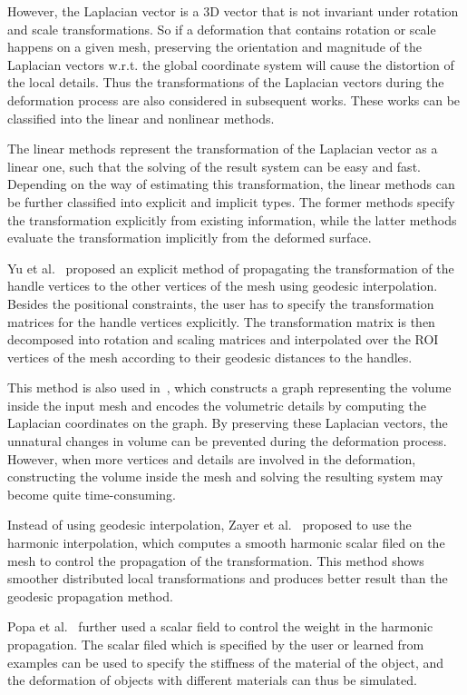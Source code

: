 However, the Laplacian vector  is a 3D vector that is not invariant
under rotation and scale transformations. So if a deformation that
contains rotation or scale happens on a given mesh, preserving the
orientation and magnitude of the Laplacian vectors w.r.t. the global
coordinate system will cause the distortion of the local details.
Thus the transformations of the Laplacian vectors during the
deformation process are also considered in subsequent works. These
works can be classified into the linear and nonlinear methods.

The linear methods represent the  transformation of the Laplacian
vector as a linear one, such that the solving of the result system
can be easy and fast. Depending on the way of estimating this
transformation, the linear methods can be further classified into
explicit and implicit types. The former methods specify the
transformation explicitly from existing information, while the
latter methods evaluate the transformation implicitly from the
deformed surface.

Yu et al.~\cite{YZXSBGS04}  proposed an explicit method of
propagating the transformation of the handle vertices to the other
vertices of the mesh using geodesic interpolation. Besides the
positional constraints, the user has to specify the transformation
matrices for the handle vertices explicitly. The transformation
matrix is then decomposed into rotation and scaling matrices and
interpolated over the ROI vertices of the mesh according to their
geodesic distances to the handles.

This method is also used in~\cite{ZHSLBGS05}, which  constructs a
graph representing the volume inside the input mesh and encodes the
volumetric details by computing the Laplacian coordinates on the
graph. By preserving these Laplacian vectors, the unnatural changes
in volume can be prevented during the deformation process. However,
when more vertices and details are involved in the deformation,
constructing the volume inside the mesh and solving the resulting
system may become quite time-consuming.

Instead of using geodesic interpolation,  Zayer et al.~\cite{ZRKS05}
proposed to use the harmonic interpolation, which computes a smooth
harmonic scalar filed on the mesh to control the propagation of the
transformation. This method shows smoother distributed local
transformations and produces better result than the geodesic
propagation method.

Popa et al.~\cite{PJS05} further used a  scalar field to control the
weight in the harmonic propagation. The scalar filed which is
specified by the user or learned from examples can be used to
specify the stiffness of the material of the object, and the
deformation of objects with different materials can thus be
simulated.


